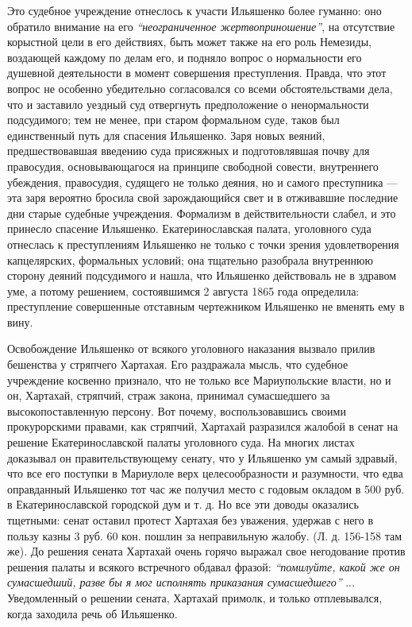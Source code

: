 \documentclass[a4paper,20pt]{article}
\begin{document}
Это судебное учреждение отнеслось к участи
Ильяшенко более гуманно: оно обратило внимание на его
\emph{``неограниченное жертвоприношение''}, на отсутствие корыстной
цели в его действиях, быть может также на его роль
Немезиды, воздающей каждому по делам его, и подняло
вопрос о нормальности его душевной деятельности в момент совершения преступления.
Правда, что этот вопрос не особенно убедительно согласовался со всеми обстоятельствами дела,
что и заставило уездный суд отвергнуть предположение о ненормальности подсудимого; тем не менее,
при старом формальном суде, таков был единственный
путь для спасения Ильяшенко. Заря новых веяний, предшествовавшая 
введению суда присяжных и подготовлявшая
почву для правосудия, основывающагося на принципе свободной совести, 
внутреннего убеждения, правосудия, судящего
не только деяния, но и самого преступника — эта заря вероятно бросила
свой зарождающийся свет и в отживавшие
последние дни старые судебные учреждения. Формализм в
действительности слабел, и это принесло спасение Ильяшенко.
Екатеринославская палата, уголовного суда отнеслась
к преступлениям Ильяшенко не только с точки зрения
удовлетворения капцелярских, формальных условий; она
тщательно разобрала внутреннюю сторону деяний подсудимого
и нашла, что Ильяшенко действоваль не в здравом уме,
а потому решением, состоявшимся 2 августа 1865 года
определила: преступление совершенные отставным чертежником
Ильяшенко не вменять ему в вину.

Освобождение Ильяшенко от всякого уголовного наказания 
вызвало прилив бешенства у стряпчего Хартахая.
Его раздражала мысль, что судебное учреждение косвенно
признало, что не только все Мариупольские власти, но и
он, Хартахай, стряпчий, страж закона, принимал сумасшедшего за высокопоставленную персону. 
Вот почему, воспользовавшись своими прокурорскими правами, как стряпчий, Хартахай
разразился жалобой в сенат на решение 
Екатеринославской палаты уголовного суда. На многих
листах доказывал он правительствующему сенату, что у
Ильяшенко ум самый здравый, что все его поступки в
Мариулоле верх целесообразности и разумности, что едва
оправданный Ильяшенко тот час же получил место с годовым окладом в 500 руб.
в Екатеринославской городской дум и т. д. Но все эти доводы оказались тщетными:
сенат оставил протест Хартахая без уважения, удержав
с него в пользу казны 3 руб. 60 кон. пошлин за неправильную жалобу. (Л. д. 156-158 там же). До решения
сената Хартахай очень горячо выражал свое негодование
против решения палаты и всякого встречного обдавал
фразой: \emph{``помилуйте, какой же он сумасшедший, разве бы
я мог исполнять приказания сумасшедшего''} ... Уведомленный о решении сената, Хартахай примолк, 
и только отплевывался, когда заходила речь об Ильяшенко.
\end{document}
